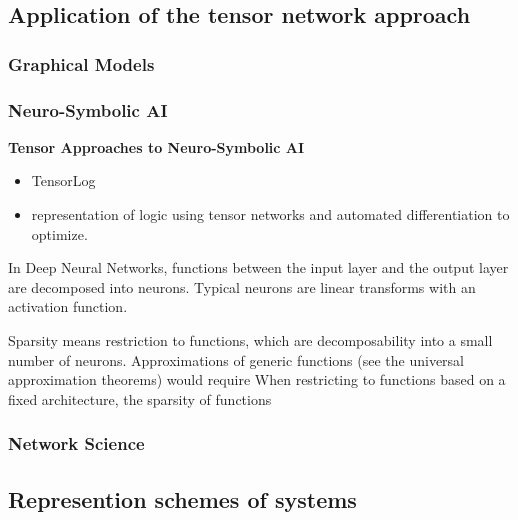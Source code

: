 \subsection{Application of the tensor network approach}

\subsubsection{Graphical Models}


\subsubsection{Neuro-Symbolic AI}

\textbf{Tensor Approaches to Neuro-Symbolic AI}
\begin{itemize}
	\item TensorLog \cite{cohen_tensorlog_2020}
	\item \cite{badreddine_logic_2022} representation of logic using tensor networks and automated differentiation to optimize.
\end{itemize}

In Deep Neural Networks, functions between the input layer and the output layer are decomposed into neurons.
Typical neurons are linear transforms with an activation function.

Sparsity means restriction to functions, which are decomposability into a small number of neurons.
Approximations of generic functions (see the universal approximation theorems) would require 
When restricting to functions based on a fixed architecture, the sparsity of functions  


\subsubsection{Network Science}



\subsection{Represention schemes of systems}


